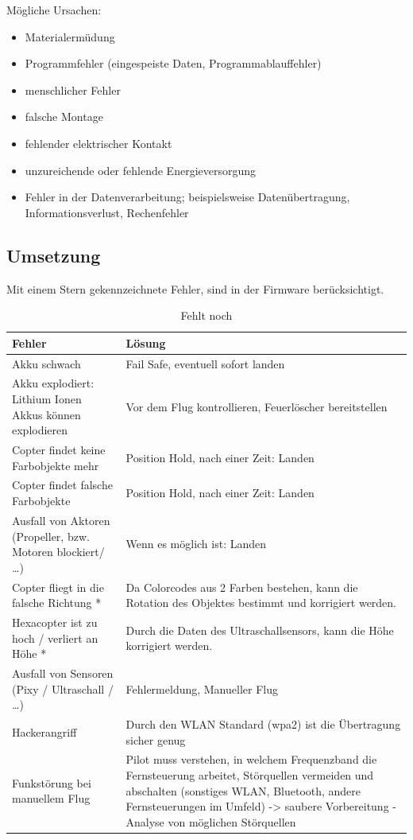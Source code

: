   Mögliche Ursachen: \cite{tech_def}
  \begin{itemize}
  \item Materialermüdung
  \item Programmfehler (eingespeiste Daten, Programmablauffehler)
  \item menschlicher Fehler
  \item falsche Montage
  \item fehlender elektrischer Kontakt
  \item unzureichende oder fehlende Energieversorgung
  \item Fehler in der Datenverarbeitung; beispielsweise Datenübertragung, Informationsverlust, Rechenfehler
  \end{itemize}


  \subsection{Umsetzung}
  Mit einem Stern gekennzeichnete Fehler, sind in der Firmware berücksichtigt.

\begin{table}[H]
\centering
\begin{tabular}{|p{7cm}|p{7cm}|}
\hline Fehler & Lösung\\\hline
\hline Akku schwach & Fail Safe, eventuell sofort landen\\
\hline Akku explodiert: Lithium Ionen Akkus können explodieren & Vor dem Flug kontrollieren, Feuerlöscher bereitstellen\\
\hline Copter findet keine Farbobjekte mehr & Position Hold, nach einer Zeit: Landen\\
\hline Copter findet falsche Farbobjekte & Position Hold, nach einer Zeit: Landen \\
\hline Ausfall von Aktoren (Propeller, bzw. Motoren blockiert/ …) &  Wenn es möglich ist: Landen\\
\hline Copter fliegt in die falsche Richtung * & Da Colorcodes aus 2 Farben bestehen, kann die Rotation des Objektes bestimmt und korrigiert werden. \\
\hline Hexacopter ist zu hoch / verliert an Höhe * & Durch die Daten des Ultraschallsensors, kann die Höhe korrigiert werden.\\
\hline Ausfall von Sensoren (Pixy / Ultraschall / …) & Fehlermeldung, Manueller Flug\\
\hline Hackerangriff & Durch den WLAN Standard (wpa2) ist die Übertragung sicher genug\\
\hline Funkstörung bei manuellem Flug & Pilot muss verstehen, in welchem Frequenzband die Fernsteuerung arbeitet, Störquellen vermeiden und abschalten (sonstiges WLAN, Bluetooth, andere Fernsteuerungen im Umfeld) -> saubere Vorbereitung - Analyse von möglichen Störquellen\\
\hline
\end{tabular}
\caption{Fehlt noch}
\end{table}

